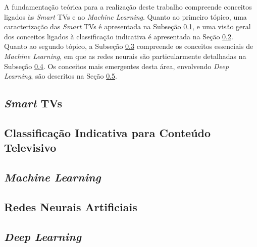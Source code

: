 
A fundamentação teórica para a realização deste trabalho compreende conceitos ligados às  \emph{Smart} TVs e ao \emph{Machine Learning}. Quanto ao primeiro tópico, uma caracterização das \emph{Smart} TVs é apresentada na Subseção \ref{sec:smarttv}, e uma visão geral dos conceitos ligados à classificação indicativa é apresentada na Seção \ref{sec:classificacaoIndicativa}. Quanto ao segundo tópico, a Subseção \ref{sec:machineLearning} compreende os conceitos essenciais de \emph{Machine Learning}, em que as redes neurais são particularmente detalhadas na Subseção \ref{sec:rnas}. Os conceitos mais emergentes desta área, envolvendo \emph{Deep Learning}, são descritos na Seção \ref{sec:deep}.

\subsection{\emph{Smart} TVs} \label{sec:smarttv}


\subsection{Classificação Indicativa para Conteúdo Televisivo} \label{sec:classificacaoIndicativa}


\subsection{\emph{Machine Learning}} \label{sec:machineLearning}


\subsection{Redes Neurais Artificiais} \label{sec:rnas}


\subsection{\emph{Deep Learning}}\label{sec:deep}

